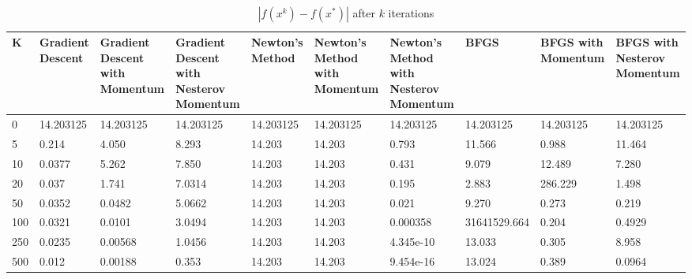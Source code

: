 \documentclass{article}
\begin{document}
\begin{center}
\begin{table}[H]
	\centering
	\caption{$ | f(x^k) - f(x^*) | $ after $k$ iterations}
	\label{Beale's function table}
	\begin{tabular}{|l|p{1.2cm}|p{1.2cm}|p{1.2cm}|p{1.2cm}|p{1.2cm}|p{1.2cm}|p{1.2cm}|p{1.2cm}|p{1.2cm}|}
		\hline
		K & Gradient Descent & Gradient Descent with Momentum & Gradient Descent with Nesterov Momentum & Newton's Method & Newton's Method with Momentum & Newton's Method with Nesterov Momentum & BFGS & BFGS with Momentum & BFGS with Nesterov Momentum \\
		\hline
		0 & 14.203125 & 14.203125 & 14.203125 & 14.203125 & 14.203125 & 14.203125 & 14.203125 & 14.203125 & 14.203125 \\
		\hline
		5 & 0.214 & 4.050 & 8.293 & 14.203 & 14.203 & 0.793 & 11.566 & 0.988 & 11.464 \\
		\hline
		10 & 0.0377 & 5.262 & 7.850 & 14.203 & 14.203 & 0.431 & 9.079 & 12.489 & 7.280 \\
		\hline
		20 & 0.037 & 1.741 & 7.0314 & 14.203 & 14.203 & 0.195 & 2.883 & 286.229 & 1.498 \\
		\hline 
		50 & 0.0352 & 0.0482 & 5.0662 & 14.203 & 14.203 & 0.021 & 9.270 & 0.273 & 0.219 \\
		\hline 
		100 & 0.0321 & 0.0101 & 3.0494 & 14.203 & 14.203 & 0.000358 & 31641529.664 & 0.204 & 0.4929 \\
		\hline
		250 & 0.0235 & 0.00568 & 1.0456 & 14.203 & 14.203 & 4.345e-10 & 13.033 & 0.305 & 8.958 \\
		\hline
		500 & 0.012 & 0.00188 & 0.353 & 14.203 & 14.203 & 9.454e-16 & 13.024 & 0.389 & 0.0964 \\
		\hline
	\end{tabular}
\end{table}
\end{center}
\end{document}
